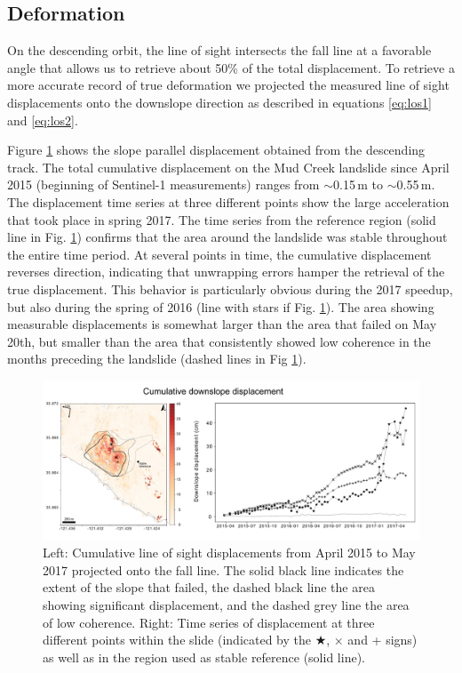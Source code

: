 \documentclass[nhess, manuscript]{copernicus}
\begin{document}
\subsection{Deformation}
On the descending orbit, the line of sight intersects the fall line at a favorable angle that allows us to retrieve about 50\% of the total displacement. To retrieve a more accurate record of true deformation we projected the measured line of sight displacements onto the downslope direction as described in equations \ref{eq:los1} and \ref{eq:los2}.\par 
Figure \ref{fig:displacement} shows the slope parallel displacement obtained from the descending track. The total cumulative displacement on the Mud Creek landslide since April 2015 (beginning of Sentinel-1 measurements) ranges from $\sim$0.15\,m to $\sim$0.55\,m. The displacement time series at three different points show the large acceleration that took place in spring 2017. The time series from the reference region (solid line in Fig. \ref{fig:displacement}) confirms that the area around the landslide was stable throughout the entire time period. At several points in time, the cumulative displacement reverses direction, indicating that unwrapping errors hamper the retrieval of the true displacement. This behavior is particularly obvious during the 2017 speedup, but also during the spring of 2016 (line with stars if Fig. \ref{fig:displacement}). The area showing measurable displacements is somewhat larger than the area that failed on May 20th, but smaller than the area that consistently showed low coherence in the months preceding the landslide (dashed lines in Fig \ref{fig:displacement}).

\begin{figure}[hbt!]
    \centering
    \includegraphics[width=\textwidth]{MudCreekDownslopeDisplacement_3_losarrow.pdf}
    \caption{Left: Cumulative line of sight displacements from April 2015 to May 2017 projected onto the fall line. The solid black line indicates the extent of the slope that failed, the dashed black line the area showing significant displacement, and the dashed grey line the area of low coherence. Right: Time series of displacement at three different points within the slide (indicated by the $\bigstar$, $\times$ and + signs) as well as in the region used as stable reference (solid line). }
    \label{fig:displacement}
\end{figure}
\end{document}
